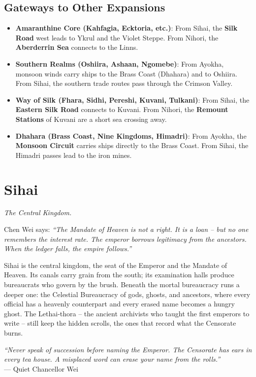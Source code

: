 \documentclass[12pt,oneside]{book}
\begin{document}
\section*{Gateways to Other Expansions}

\begin{itemize}
  \item \textbf{Amaranthine Core (Kahfagia, Ecktoria, etc.)}: From Sihai, the \textbf{Silk Road} west leads to Ykrul and the Violet Steppe. From Nihori, the \textbf{Aberderrin Sea} connects to the Linns.
  \item \textbf{Southern Realms (Oshiira, Ashaan, Ngomebe)}: From Ayokha, monsoon winds carry ships to the Brass Coast (Dhahara) and to Oshiira. From Sihai, the southern trade routes pass through the Crimson Valley.
  \item \textbf{Way of Silk (Fhara, Sidhi, Pereshi, Kuvani, Tulkani)}: From Sihai, the \textbf{Eastern Silk Road} connects to Kuvani. From Nihori, the \textbf{Remount Stations} of Kuvani are a short sea crossing away.
  \item \textbf{Dhahara (Brass Coast, Nine Kingdoms, Himadri)}: From Ayokha, the \textbf{Monsoon Circuit} carries ships directly to the Brass Coast. From Sihai, the Himadri passes lead to the iron mines.
\end{itemize}
\newpage
\chapter{Sihai}
\emph{The Central Kingdom.}

\noindent
Chen Wei says: \textit{``The Mandate of Heaven is not a right. It is a loan -- but no one remembers the interest rate. The emperor borrows legitimacy from the ancestors. When the ledger falls, the empire follows.''}

\noindent
Sihai is the central kingdom, the seat of the Emperor and the Mandate of Heaven. Its canals carry grain from the south; its examination halls produce bureaucrats who govern by the brush. Beneath the mortal bureaucracy runs a deeper one: the Celestial Bureaucracy of gods, ghosts, and ancestors, where every official has a heavenly counterpart and every erased name becomes a hungry ghost. The Lethai-thora -- the ancient archivists who taught the first emperors to write -- still keep the hidden scrolls, the ones that record what the Censorate burns.

\vspace{0.5em}
\noindent\textit{``Never speak of succession before naming the Emperor. The Censorate has ears in every tea house. A misplaced word can erase your name from the rolls.''} \\
--- Quiet Chancellor Wei
\end{document}
